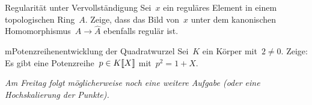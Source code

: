 \documentclass[entwurf]{uebblatt}
\begin{document}
\begin{aufgabe}{2}{Regularität unter Vervollständigung}
Sei~$x$ ein reguläres Element in einem topologischen Ring~$A$. Zeige, dass das
Bild von~$x$ unter dem kanonischen Homomorphismus~$A \to \hat A$ ebenfalls regulär ist.
\end{aufgabe}

\begin{aufgabe}{m}{Potenzreihenentwicklung der Quadratwurzel}
Sei~$K$ ein Körper mit~$2 \neq 0$. Zeige: Es gibt eine Potenzreihe~$p \in
{K}\llbracket{X}\rrbracket$ mit~$p^2 = 1 + X$.
\end{aufgabe}

\emph{Am Freitag folgt möglicherweise noch eine weitere Aufgabe (oder eine
Hochskalierung der Punkte).}
\end{document}
